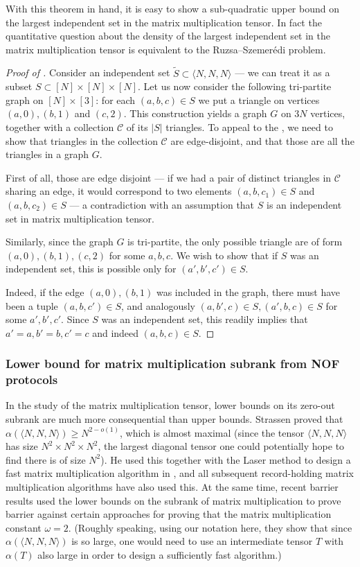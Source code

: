 \documentclass[10pt,a4paper]{article}
\newcommand{\cC}{\mathcal{C}}
\newcommand{\inprod}[1]{\langle #1 \rangle}
\newcommand{\jnote}[1]{\todo[inline, color=blue!30!white]{#1 \\ -\textsc{Jarek}}}
\begin{document}
With this theorem in hand, it is easy to show a sub-quadratic upper bound on the largest independent set in the matrix multiplication tensor. In fact the quantitative question about the density of the largest independent set in the matrix multiplication tensor is equivalent to the Ruzsa–Szemerédi problem.
\begin{proof}[Proof of ]
Consider an independent set $\tilde{S} \subset \inprod{N,N,N}$ --- we can treat it as a subset $S \subset [N] \times [N] \times [N]$. Let us now consider the following tri-partite graph on $[N] \times [3]$: for each $(a,b,c) \in S$ we put a triangle on vertices $(a,0), (b,1)$ and $(c,2)$. This construction yields a graph $G$ on $3 N$ vertices, together with a collection $\cC$ of its $|S|$ triangles. To appeal to the , we need to show that triangles in the collection $\cC$ are edge-disjoint, and that those are all the triangles in a graph $G$.

First of all, those are edge disjoint --- if we had a pair of distinct triangles in $\cC$ sharing an edge, it would correspond to two elements $(a,b, c_1) \in S$ and $(a,b, c_2) \in S$ --- a contradiction with an assumption that $S$ is an independent set in matrix multiplication tensor.

Similarly, since the graph $G$ is tri-partite, the only possible triangle are of form $(a,0), (b, 1), (c, 2)$ for some $a, b, c$. We wish to show that if $S$ was an independent set, this is possible only for $(a', b', c') \in S$.

Indeed, if the edge $(a, 0), (b, 1)$ was included in the graph, there must have been a tuple $(a, b, c') \in S$, and analogously $(a, b', c) \in S, (a',b,c) \in S$ for some $a', b', c'$. Since $S$ was an independent set, this readily implies that $a'=a, b'=b, c'=c$ and indeed $(a,b,c) \in S$.
\end{proof}

\subsubsection{Lower bound for matrix multiplication subrank from NOF protocols}

In the study of the matrix multiplication tensor, lower bounds on its zero-out subrank are much more consequential than upper bounds. Strassen proved that $\alpha(\inprod{N,N,N}) \geq N^{2-o(1)}$, which is almost maximal (since the tensor $\inprod{N,N,N}$ has size $N^2 \times N^2 \times N^2$, the largest diagonal tensor one could potentially hope to find there is of size $N^2$). He used this together with the Laser method to design a fast matrix multiplication algorithm in \cite{S86}, and all subsequent record-holding matrix multiplication algorithms have also used this. At the same time, recent barrier results \cite{AW21,A21,CVZ21} used the lower bounds on the subrank of matrix multiplication to prove barrier against certain approaches for proving that the matrix multiplication constant $\omega=2$. (Roughly speaking, using our notation here, they show that since $\alpha(\inprod{N,N,N})$ is so large, one would need to use an intermediate tensor $T$ with $\alpha(T)$ also large in order to design a sufficiently fast algorithm.)
\end{document}

